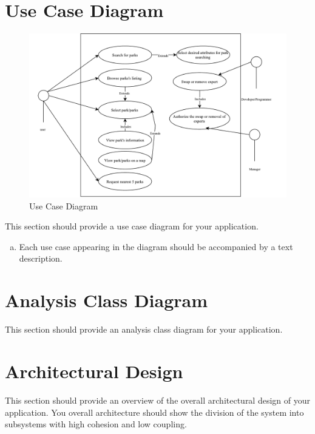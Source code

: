\documentclass[titlepage]{article}
\begin{document}
\section{Use Case Diagram}
\label{sec:use_case_diagram}
\begin{figure}[htbp]
\centerline{\includegraphics[width=1.0\textwidth]{images//UseCase.pdf}}
\caption{Use Case Diagram}
\label{useCaseDiagram}
\end{figure}


This section should provide a use case diagram for your application. 
\begin{enumerate}[a)]
    \item Each use case appearing in the diagram should be accompanied by a text description. 
\end{enumerate}

\section{Analysis Class Diagram}
\label{sec:analysis_class_diagram}
This section should provide an analysis class diagram for your application.


\section{Architectural Design}
\label{sec:architectural_design}
This section should provide an overview of the overall architectural design of your application. You
overall architecture should show the division of the system into subsystems with high cohesion and
low coupling.
\end{document}

